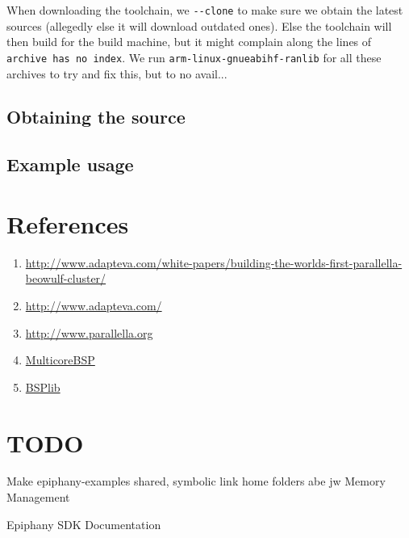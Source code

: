 \documentclass[fleqn]{article}
\renewcommand{\(}{\left(}
\renewcommand{\)}{\right)}
\begin{document}
When downloading the toolchain, we \verb+--clone+ to make sure we obtain the latest sources (allegedly else it will download outdated ones). Else the toolchain will then build for the build machine, but it might complain along the lines of \texttt{archive has no index}. We run \texttt{arm-linux-gnueabihf-ranlib} for all these archives to try and fix this, but to no avail...


\subsection{Obtaining the source}

\subsection{Example usage}

\section{References}

\begin{enumerate}
    \item \url{http://www.adapteva.com/white-papers/building-the-worlds-first-parallella-beowulf-cluster/}
    \item \url{http://www.adapteva.com/}
    \item \url{http://www.parallella.org}
    \item \url{MulticoreBSP}
    \item \url{BSPlib}
\end{enumerate}

\section{TODO}

Make epiphany-examples shared, symbolic link home folders abe jw
Memory Management


\begin{thebibliography}{9}

  Epiphany SDK Documentation

    
\end{thebibliography}
\end{document}
